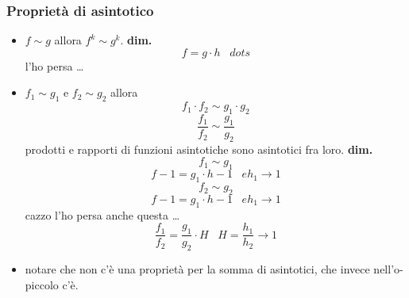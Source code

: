 \subsubsection*{Proprietà di asintotico}
\begin{itemize}
    \item $f \sim g$ allora $f^k \sim g^k$.
    \newline
    \textbf{dim.} 
    \[
        f = g \cdot  h \;\;\; dots
    \] 
    l'ho persa \dots
    \item $f_1 \sim g_1$ e $f_2 \sim  g_2$ allora
    \[
        f_1 \cdot  f_2 \sim  g_1 \cdot  g_2    
    \]
    \[
        \frac{f_1}{f_2} \sim \frac{g_1}{g_2}
    \]
    prodotti e rapporti di funzioni asintotiche sono asintotici fra loro.
    \textbf{dim.}
    \[
        f_1 \sim  g_1
    \] 
    \[
        f-1 = g_1 \cdot  h-1 \;\;\; e h_1 \rightarrow 1
    \]
    \[
        f_2 \sim  g_2
    \] 
    \[
        f-1 = g_1 \cdot  h-1 \;\;\; e h_1 \rightarrow 1
    \]
    cazzo l'ho persa anche questa \dots
    \[
        \frac{f_1}{f_2} = \frac{g_1}{g_2} \cdot H \;\;\; H = \frac{h_1}{h_2}\rightarrow 1
    \]
    \item notare che non c'è una proprietà per la somma di asintotici, che invece nell'o-piccolo c'è. 
\end{itemize}
